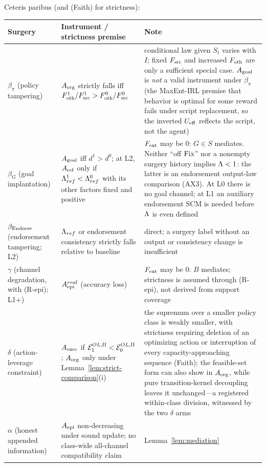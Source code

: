 \begin{theorem}\label{thm:coverage}
Ceteris paribus (and \textup{(Faith)} for strictness):
\begingroup\small
\begin{longtable}{@{}>{\raggedright\arraybackslash}p{}
>{\raggedright\arraybackslash}p{}
>{\raggedright\arraybackslash}p{}@{}}
\toprule
Surgery & Instrument / strictness premise & Note \\
\midrule
\endhead
\bottomrule
\endfoot
$\beta_\pi$ (policy tampering) & $A_{\mathrm{org}}$ strictly falls iff
$F_{\mathrm{oth}}^1/F_{\mathrm{src}}^1>F_{\mathrm{oth}}^0/F_{\mathrm{src}}^0$ & conditional law given
$S_t$ varies with $I$; fixed $F_{\mathrm{src}}$ and increased $F_{\mathrm{oth}}$ are only a
sufficient special case. $A_{\mathrm{goal}}$ is \emph{not} a valid instrument under
$\beta_\pi$ (the MaxEnt-IRL premise that behavior is optimal for some reward
fails under script replacement, so the inverted $U_{\mathrm{eff}}$ reflects the script,
not the agent) \\
$\beta_G$ (goal implantation) & $A_{\mathrm{goal}}$ iff $d^1>d^0$; at L2, $A_{\mathrm{ref}}$ only if
$\Lambda_{ref}^1<\Lambda_{ref}^0$ with its other factors fixed and positive & $F_{\mathrm{ext}}$ may be $0$:
$G\in S$ mediates. Neither ``off $\mathrm{Fix}$'' nor a nonempty surgery history
implies $\Lambda<1$: the latter is an endorsement output-law comparison (AX3).
At L0 there is no goal channel; at L1 an auxiliary endorsement SCM is needed
before $\Lambda$ is even defined \\
$\beta_{\mathrm{Endorse}}$ (endorsement tampering; L2) & $\Lambda_{ref}$ or endorsement
consistency strictly falls relative to baseline & direct; a surgery label
without an output or consistency change is insufficient \\
$\gamma$ (channel degradation, with (R-epi); L1+) & $A_{\mathrm{epi}}^{real}$ (accuracy loss) & $F_{\mathrm{ext}}$ may
be $0$: $B$ mediates; strictness is assumed through (R-epi), not derived from
support coverage \\
$\delta$ (action-leverage constraint) & $A_{\mathrm{exec}}$ if $\mathcal{E}^{OL,\Pi}_1<\mathcal{E}^{OL,\Pi}_0$;
$A_{\mathrm{org}}$ only under Lemma~\ref{lem:strict-comparison}(i) & the supremum over a
smaller policy class is weakly smaller, with strictness requiring deletion of
an optimizing action or interruption of every capacity-approaching sequence
(Faith); the feasible-set form can also show in $A_{\mathrm{org}}$,
while pure transition-kernel decoupling leaves it unchanged---a registered
within-class division, witnessed by the two $\delta$ arms \\
$\alpha$ (honest appended information) & $A_{\mathrm{epi}}$ non-decreasing under sound
update; no class-wide all-channel compatibility claim & Lemma~\ref{lem:mediation}

\end{longtable}
\end{theorem}
